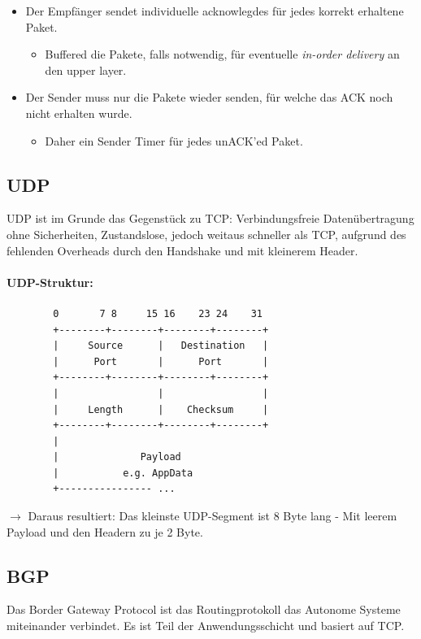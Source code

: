 \documentclass{scrartcl}
\begin{document}
    \begin{itemize}
        \item Der Empfänger sendet individuelle acknowlegdes für jedes korrekt erhaltene Paket. 
        \begin{itemize}
            \item Buffered die Pakete, falls notwendig, für eventuelle \emph{in-order delivery} an den upper layer.
        \end{itemize}
        \item Der Sender muss nur die Pakete wieder senden, für welche das ACK noch nicht erhalten wurde.
        \begin{itemize}
            \item Daher ein Sender Timer für jedes unACK'ed Paket.
        \end{itemize}
        
    \end{itemize}

    \subsection{UDP}
    \label{protocols:udp}
    UDP ist im Grunde das Gegenstück zu TCP: Verbindungsfreie Datenübertragung ohne Sicherheiten, Zustandslose, jedoch weitaus schneller als TCP, aufgrund des fehlenden Overheads durch den Handshake und mit kleinerem Header.
    
    \paragraph{UDP-Struktur:}
    
    \begin{verbatim}
        0       7 8     15 16    23 24    31  
        +--------+--------+--------+--------+ 
        |     Source      |   Destination   | 
        |      Port       |      Port       | 
        +--------+--------+--------+--------+ 
        |                 |                 | 
        |     Length      |    Checksum     | 
        +--------+--------+--------+--------+ 
        |                                     
        |              Payload 
        |           e.g. AppData
        +---------------- ...                 
    \end{verbatim}
    $\rightarrow$ Daraus resultiert: Das kleinste UDP-Segment ist 8 Byte lang - Mit leerem Payload und den Headern zu je 2 Byte.
    
    
    \subsection{BGP}
    Das Border Gateway Protocol ist das Routingprotokoll das Autonome Systeme miteinander verbindet. Es ist Teil der Anwendungsschicht und basiert auf TCP.
    
\end{document}
